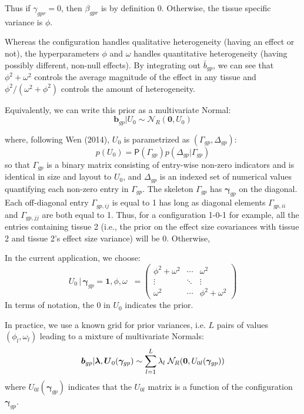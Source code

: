 \documentclass[10pt]{article}
\newcommand{\Prd}{\mathsf{P}} %
\newcommand{\Norm}{{\mathcal{N}}} %
\newcommand{\Uv}{\mbox{\boldmath$U$}}
\begin{document}
 Thus if $\gamma_{gpr}=0$, then $\beta_{gpr}$ is by definition 0. Otherwise, the tissue specific variance is $\phi$. 
 
Whereas the configuration handles qualitative heterogeneity (having an effect or not), the hyperparameters $\phi$ and $\omega$ handles quantitative heterogeneity (having possibly different, non-null effects).
By integrating out $\bar{b}_{gp}$, we can see that $\phi^2 + \omega^2$ controls the average magnitude of the effect in any tissue  and $\phi^2/(\omega^2+\phi^2)$ controls the amount of heterogeneity.

Equivalently, we can write this prior as a multivariate Normal:
\begin{equation}
  \bm{b}_{gp} | U_{0} \sim \Norm_R(\bm{0}, U_{0})
\end{equation}

where, following Wen (2014), $U_{0}$ is parametrized as $(\Gamma_{gp},\Delta_{gp})$:
\begin{equation}
  p(U_{0}) = \Prd(\Gamma_{gp}) p(\Delta_{gp} | \Gamma_{gp})
\end{equation}
so that $\Gamma_{gp}$ is a binary matrix consisting of entry-wise non-zero indicators and is identical in size and layout to $U_{0}$, and $\Delta_{gp}$ is an indexed set of numerical values quantifying each non-zero entry in $\Gamma_{gp}$.
The skeleton $\Gamma_{gp}$ has $\bm{\gamma}_{gp}$ on the diagonal.
Each off-diagonal entry $\Gamma_{gp,ij}$ is equal to 1 has long as diagonal elements $\Gamma_{gp,ii}$ and $\Gamma_{gp,jj}$ are both equal to 1. Thus, for a configuration 1-0-1 for example, all the entries containing tissue 2 (i.e., the prior on the effect size covariances with tissue 2 and tissue 2's effect size variance) will be 0. Otherwise, 

In the current application, we choose:
\begin{equation}
  U_{0} \, | \, \bm{\gamma}_{gp} = \bm{1}, \phi, \omega \; \; =
  \begin{pmatrix}
    \phi^2 + \omega^2 & \cdots & \omega^2 \\
    \vdots & \ddots & \vdots \\
    \omega^2 & \cdots & \phi^2 + \omega^2
  \end{pmatrix}
\end{equation}
In terms of notation, the $0$ in $U_{0}$ indicates the prior.


In practice, we use a known grid for prior variances, i.e. $L$ pairs of values $(\phi_l,\omega_l)$ leading to a mixture of multivariate Normals:
\begin{equation}
  \label{prior_b_mixt_grid}
  \bm{b}_{gp} | \bm{\lambda},\Uv_0(\bm{\gamma}_{gp}) \sim \sum_{l=1}^L \lambda_l \; \Norm_R(\bm{0}, U_{0l}(\bm{\gamma}_{gp}))
\end{equation}
where $U_{0l}(\bm{\gamma}_{gp})$ indicates that the $U_{0l}$ matrix is a function of the configuration $\bm{\gamma}_{gp}$.
\end{document}
